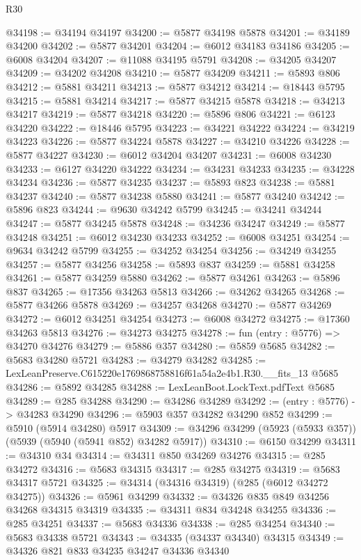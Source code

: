\begin{lexlean}{R30}
\begin{coremodule}
@34198 := @34194 @34197
@34200 := @5877 @34198 @5878
@34201 := @34189 @34200
@34202 := @5877 @34201
@34204 := @6012 @34183 @34186
@34205 := @6008 @34204
@34207 := @11088 @34195 @5791
@34208 := @34205 @34207
@34209 := @34202 @34208
@34210 := @5877 @34209
@34211 := @5893 @806
@34212 := @5881 @34211
@34213 := @5877 @34212
@34214 := @18443 @5795
@34215 := @5881 @34214
@34217 := @5877 @34215 @5878
@34218 := @34213 @34217
@34219 := @5877 @34218
@34220 := @5896 @806
@34221 := @6123 @34220
@34222 := @18446 @5795
@34223 := @34221 @34222
@34224 := @34219 @34223
@34226 := @5877 @34224 @5878
@34227 := @34210 @34226
@34228 := @5877 @34227
@34230 := @6012 @34204 @34207
@34231 := @6008 @34230
@34233 := @6127 @34220 @34222
@34234 := @34231 @34233
@34235 := @34228 @34234
@34236 := @5877 @34235
@34237 := @5893 @823
@34238 := @5881 @34237
@34240 := @5877 @34238 @5880
@34241 := @5877 @34240
@34242 := @5896 @823
@34244 := @9630 @34242 @5799
@34245 := @34241 @34244
@34247 := @5877 @34245 @5878
@34248 := @34236 @34247
@34249 := @5877 @34248
@34251 := @6012 @34230 @34233
@34252 := @6008 @34251
@34254 := @9634 @34242 @5799
@34255 := @34252 @34254
@34256 := @34249 @34255
@34257 := @5877 @34256
@34258 := @5893 @837
@34259 := @5881 @34258
@34261 := @5877 @34259 @5880
@34262 := @5877 @34261
@34263 := @5896 @837
@34265 := @17356 @34263 @5813
@34266 := @34262 @34265
@34268 := @5877 @34266 @5878
@34269 := @34257 @34268
@34270 := @5877 @34269
@34272 := @6012 @34251 @34254
@34273 := @6008 @34272
@34275 := @17360 @34263 @5813
@34276 := @34273 @34275
@34278 := fun (entry : @5776) => @34270 @34276
@34279 := @5886 @357
@34280 := @5859 @5685
@34282 := @5683 @34280 @5721
@34283 := @34279 @34282
@34285 := LexLeanPreserve.C615220e1769868758816f61a54a2e4b1.R30.__fits_13 @5685
@34286 := @5892 @34285
@34288 := LexLeanBoot.LockText.pdfText @5685
@34289 := @285 @34288
@34290 := @34286 @34289
@34292 := (entry : @5776) -> @34283 @34290
@34296 := @5903 @357 @34282 @34290 @852
@34299 := @5910 (@5914 @34280) @5917
@34309 := @34296 @34299 (@5923 (@5933 @357)) (@5939 (@5940 (@5941 @852) @34282 @5917))
@34310 := @6150 @34299
@34311 := @34310 @34
@34314 := @34311 @850 @34269 @34276
@34315 := @285 @34272
@34316 := @5683 @34315
@34317 := @285 @34275
@34319 := @5683 @34317 @5721
@34325 := @34314 (@34316 @34319) (@285 (@6012 @34272 @34275))
@34326 := @5961 @34299
@34332 := @34326 @835 @849 @34256 @34268 @34315 @34319
@34335 := @34311 @834 @34248 @34255
@34336 := @285 @34251
@34337 := @5683 @34336
@34338 := @285 @34254
@34340 := @5683 @34338 @5721
@34343 := @34335 (@34337 @34340) @34315
@34349 := @34326 @821 @833 @34235 @34247 @34336 @34340

\end{coremodule}
\end{lexlean}
